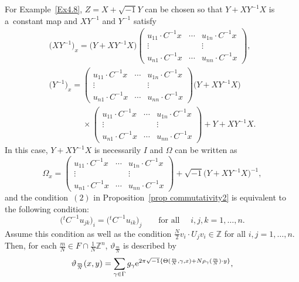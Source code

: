 \documentclass[10pt,a4paper]{amsart}
\numberwithin{equation}{section}
\newcommand{\Z}{\mathbb{Z}}
\begin{document}
\begin{Example}\label{EX4.8-2}
For Example~\ref{Ex4.8}, $Z=X+\sqrt{-1}Y$ can be chosen so that $Y+XY^{-1}X$ is a~constant map and $XY^{-1}$ and $Y^{-1}$ satisfy
\begin{gather*}
\bigl(XY^{-1}\bigr)_x=\bigl(Y+XY^{-1}X\bigr)
\begin{pmatrix}
u_{11}\cdot C^{-1}x & \cdots & u_{1n}\cdot C^{-1}x \\
\vdots & & \vdots \\
u_{n1}\cdot C^{-1}x & \cdots & u_{nn}\cdot C^{-1}x
\end{pmatrix}, \\
\bigl(Y^{-1}\bigr)_x=
\begin{pmatrix}
u_{11}\cdot C^{-1}x & \cdots & u_{1n}\cdot C^{-1}x \\
\vdots & & \vdots \\
u_{n1}\cdot C^{-1}x & \cdots & u_{nn}\cdot C^{-1}x
\end{pmatrix}
\bigl(Y+XY^{-1}X\bigr)\\
\phantom{\bigl(Y^{-1}\bigr)_x=}{}\times
\begin{pmatrix}
u_{11}\cdot C^{-1}x & \cdots & u_{1n}\cdot C^{-1}x \\
\vdots & & \vdots \\
u_{n1}\cdot C^{-1}x & \cdots & u_{nn}\cdot C^{-1}x
\end{pmatrix}+Y+XY^{-1}X.
\end{gather*}
In this case, $Y+XY^{-1}X$ is necessarily $I$ and $\Omega$ can be written as
\[
\Omega_x=
\begin{pmatrix}
u_{11}\cdot C^{-1}x & \cdots & u_{1n}\cdot C^{-1}x \\
\vdots & & \vdots \\
u_{n1}\cdot C^{-1}x & \cdots & u_{nn}\cdot C^{-1}x
\end{pmatrix}
+\sqrt{-1}\bigl(Y+XY^{-1}X\bigr)^{-1},
\]
and the condition~$(2)$ in Proposition~\ref{prop commutativity2} is equivalent to the following condition:
\begin{equation*}
\bigl({}^tC^{-1}u_{jk}\bigr)_i=\bigl({}^tC^{-1}u_{ik}\bigr)_j\qquad \text{for all }\quad i, j, k=1,\ldots , n.
\end{equation*}
Assume this condition as well as the condition $\frac{N}{2}v_i\cdot U_jv_i\in \Z$ for all $i, j=1,\ldots , n$. Then, for each $\frac{m}{N}\in F\cap \frac{1}{N}\Z^n$, $\vartheta_{\frac{m}{N}}$ is described by
\begin{align*}
\vartheta_{\frac{m}{N}}(x,y)=\sum_{\gamma \in \Gamma}g_\gamma {\rm e}^{2\pi\sqrt{-1}\{\Theta (\frac{m}{N}, \gamma, x)+N\rho_\gamma (\frac{m}{N})\cdot y\}},

\end{align*}
\end{Example}
\end{document}
